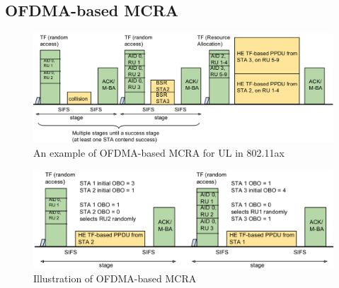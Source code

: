 \documentclass[journal]{IEEEtran}
\begin{document}



\subsection{OFDMA-based MCRA}		\label{sec_RA_illu}



\begin{figure}[!ht]
\centering
\includegraphics[scale=0.35]{./figure/RA_illu_2.png}
\caption{An example of OFDMA-based MCRA for UL in 802.11ax }
\label{fig_ra_ul}
\end{figure}

\begin{figure}[!ht]
\centering
\includegraphics[scale=0.35]{./figure/RA_illu.png}
\caption{Illustration of OFDMA-based MCRA}
\label{fig_ra_illu}
\end{figure}
\end{document}
